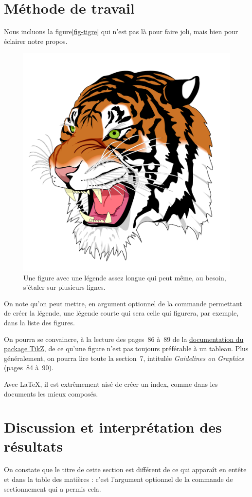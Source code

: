 \documentclass[12pt,space=onehalf,version=final]{yathesis}
\newcommand{\package}[1]{\textsf{#1}}
\begin{document}
\lipsum[3-22]
%
\section{Méthode de travail}
\label{sec-methode}
%
Nous incluons la figure\vref{fig-tigre} qui n'est
pas là pour faire joli, mais bien pour éclairer notre propos.
\begin{figure}
  \centering
  \capstart
  \includegraphics[width=.35\linewidth]{tiger}
  \caption[Un tigre]{Une figure avec une légende assez longue qui peut
    même, au besoin, s'étaler sur plusieurs lignes.}
  \label{fig-tigre}
\end{figure}
On note qu'on peut mettre, en argument optionnel de la commande
permettant de créer la légende, une légende \og courte\fg{} qui sera
celle qui figurera, par exemple, dans la liste des figures.

On pourra se convaincre, à la lecture des pages~86 à~89 de la
\href{http://mirrors.ctan.org/graphics/pgf/base/doc/generic/pgf/pgfmanual.pdf}{documentation
  du package \package{TikZ}}, de ce qu'une figure
n'est pas toujours préférable à un tableau. Plus
généralement, on pourra lire toute la section~7, intitulée \emph{Guidelines on
  Graphics} (pages~84 à~90).

Avec \LaTeX{}, il est extrêmement aisé de créer
un index, comme dans les documents les mieux
composés.

\lipsum[23-42]
%
\section[Discussion]{Discussion et interprétation des résultats}
\label{sec-discussion}
%
On constate que le titre de cette section est différent de ce qui
apparaît en entête et dans la table des matières : c'est l'argument
optionnel de la commande de sectionnement qui a permis cela.

\lipsum[43-52]
\end{document}
